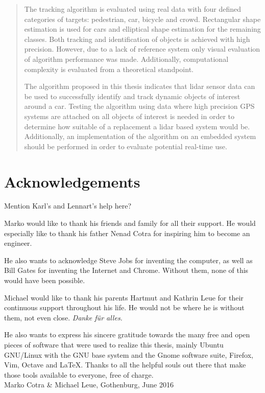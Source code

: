 \begin{abstract}
The tracking algorithm is evaluated using real data with four defined categories of targets: pedestrian, car, bicycle and crowd. Rectangular shape estimation is used for cars and elliptical shape estimation for the remaining classes. Both tracking and identification of objects is achieved with high precision. However, due to a lack of reference system only visual evaluation of algorithm performance was made. Additionally, computational complexity is evaluated from a theoretical standpoint.

The algorithm proposed in this thesis indicates that lidar sensor data can be used to successfully identify and track dynamic objects of interest around a car. Testing the algorithm using data where high precision GPS systems are attached on all objects of interest is needed in order to determine how suitable of a replacement a lidar based system would be. Additionally, an implementation of the algorithm on an embedded system should be performed in order to evaluate potential real-time use. 

\end{abstract}

\newpage
\clearpage
\mbox{}
\newpage
\clearpage
\thispagestyle{empty}
\section*{Acknowledgements}
Mention Karl's and Lennart's help here?

Marko would like to thank his friends and family for all their support. He would especially like to thank his father Nenad Cotra for inspiring him to become an engineer. 

He also wants to acknowledge Steve Jobs for inventing the computer, as well as Bill Gates for inventing the Internet and Chrome. Without them, none of this would have been possible.

Michael would like to thank his parents Hartmut and Kathrin Leue for their continuous support throughout his life. He would not be where he is without them, not even close. \textit{Danke für alles.}

He also wants to express his sincere gratitude towards the many free and open pieces of software that were used to realize this thesis, mainly Ubuntu GNU/Linux with the GNU base system and the Gnome software suite, Firefox, Vim, Octave and \LaTeX. Thanks to all the helpful souls out there that make those tools available to everyone, free of charge.
\\[1cm]

\hfill Marko Cotra \& Michael Leue, Gothenburg, June 2016 
\newpage
\clearpage
\mbox{}